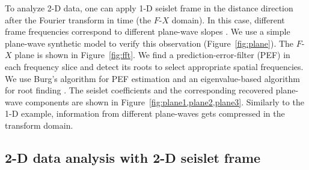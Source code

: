  To analyze 2-D data, one can apply 1-D seislet frame in the distance
 direction after the Fourier transform in time (the $F$-$X$
 domain). In this case, different frame frequencies correspond to
 different plane-wave slopes \cite[]{Canales84}. We use a simple
 plane-wave synthetic model to verify this observation
 (Figure~\ref{fig:plane}). The $F$-$X$ plane is shown in
 Figure~\ref{fig:fft}. We find a prediction-error-filter (PEF) in each
 frequency slice and detect its roots to select appropriate spatial
 frequencies. We use Burg's algorithm for PEF estimation
 \cite[]{Burg75,Claerbout76} and an eigenvalue-based algorithm for
 root finding \cite[]{roots}. The seislet coefficients and the
 corresponding recovered plane-wave components are shown in
 Figure~\ref{fig:plane1,plane2,plane3}. Similarly to the 1-D example,
 information from different plane-waves gets  compressed
 in the transform domain.

\subsection{2-D data analysis with 2-D seislet frame} 

